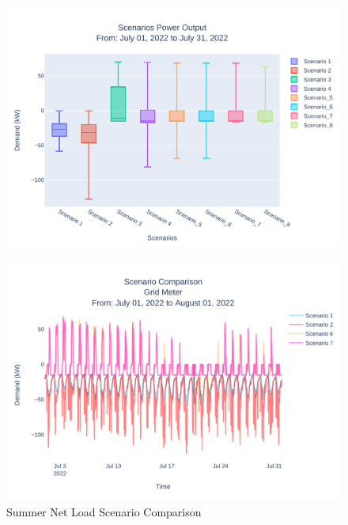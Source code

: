 \documentclass[conference]{IEEEtran}
\begin{document}
	\begin{figure}[H]
		\centering
		\includegraphics[width=1\linewidth]{Fig/4_Scn_Output_Run_3_Jul_01_2022_to_Jul_31_2022}
		\caption{}
		\label{fig:4scnoutputrun2jul012022tojul312022}
	\end{figure}
	
	



    
	\begin{figure}[H]
		\centering
		\includegraphics[width=1\linewidth]{Fig/net_load_scenario_comparison_summer_run_3}
		\caption{Summer Net Load Scenario Comparison}
		\label{fig:netloadscenariocomparisonsummer}
	\end{figure}
	
\end{document}
